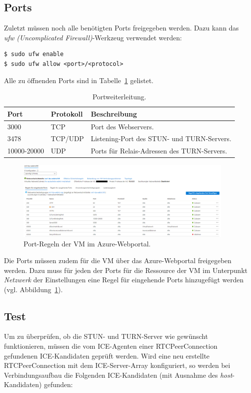 \subsection{Ports}
Zuletzt müssen noch alle benötigten Ports freigegeben werden. Dazu kann das \textit{ufw (Uncomplicated Firewall)}-Werkzeug verwendet werden:
\lstset{style=STYLE_COMMAND_LINE_ARGUMENT_SINGLE_LINE}
\begin{lstlisting}[belowskip=-0.8 \baselineskip]
$ sudo ufw enable
$ sudo ufw allow <port>/<protocol>
\end{lstlisting}

Alle zu öffnenden Ports sind in Tabelle~\ref{table:ports} gelistet.

\begin{table}[ht]
\centering
\begin{tabularx}{\textwidth}{llX}
\toprule
Port&Protokoll&Beschreibung\\
\midrule
3000&TCP&Port des Webservers.\\
3478&TCP/UDP&Listening-Port des STUN- und TURN-Servers.\\
10000-20000&UDP&Ports für Relais-Adressen des TURN-Servers.\\
\bottomrule

\end{tabularx}
\caption{Portweiterleitung.}
\label{table:ports}
\end{table}

\begin{figure}[h]
\centering
\includegraphics[width=0.95\textwidth]{bilder/azure-vm-network-config.png}
\caption{Port-Regeln der VM im Azure-Webportal.}
\label{fig:azurevmconfig}
\end{figure}

Die Ports müssen zudem für die \acs{VM} über das Azure-Webportal freigegeben werden. Dazu muss für jeden der Ports für die Ressource der VM im Unterpunkt \textit{Netzwerk} der Einstellungen eine Regel für eingehende Ports hinzugefügt werden (vgl. Abbildung~\ref{fig:azurevmconfig}).

\subsection{Test}
Um zu überprüfen, ob die STUN- und TURN-Server wie gewünscht funktionieren, müssen die vom ICE-Agenten einer RTCPeerConnection gefundenen ICE-Kandidaten geprüft werden. Wird eine neu erstellte RTCPeerConnection mit dem ICE-Server-Array konfiguriert, so werden bei Verbindungsaufbau die Folgenden ICE-Kandidaten (mit Ausnahme des \textit{host}-Kandidaten) gefunden:

